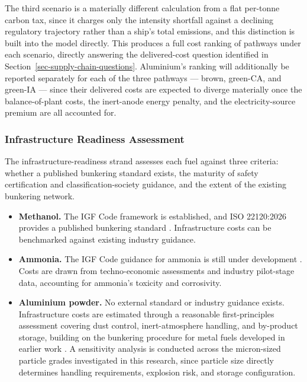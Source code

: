 \documentclass[12pt]{article}
\begin{document}
The third scenario is a materially different calculation from a flat per-tonne 
carbon tax, since it charges only the intensity shortfall against a declining 
regulatory trajectory rather than a ship's total emissions, and this distinction 
is built into the model directly. This produces a full cost ranking of pathways 
under each scenario, directly answering the delivered-cost question identified 
in Section~\ref{sec-supply-chain-questions}. Aluminium's ranking will 
additionally be reported separately for each of the three pathways --- brown, 
green-CA, and green-IA --- since their delivered costs are expected to diverge 
materially once the balance-of-plant costs, the inert-anode energy penalty, and 
the electricity-source premium are all accounted for.

\subsubsection*{Infrastructure Readiness Assessment}

The infrastructure-readiness strand assesses each fuel against three criteria: 
whether a published bunkering standard exists, the maturity of safety 
certification and classification-society guidance, and the extent of the existing 
bunkering network.

\begin{itemize}
    \item \textbf{Methanol.} The IGF Code framework is established, and ISO 
    22120:2026 provides a published bunkering standard \cite{iso-22120-2026}. 
    Infrastructure costs can be benchmarked against existing industry guidance.

    \item \textbf{Ammonia.} The IGF Code guidance for ammonia is still under 
    development \cite{imo-ammonia-guidelines}. Costs are drawn from 
    techno-economic assessments and industry pilot-stage data, accounting for 
    ammonia's toxicity and corrosivity.

    \item \textbf{Aluminium powder.} No external standard or industry guidance 
    exists. Infrastructure costs are estimated through a reasonable 
    first-principles assessment covering dust control, inert-atmosphere handling, 
    and by-product storage, building on the bunkering procedure for metal fuels 
    developed in earlier work \cite{iron-powder-container-ships}. A sensitivity 
    analysis is conducted across the micron-sized particle grades investigated in 
    this research, since particle size directly determines handling requirements, 
    explosion risk, and storage configuration.
\end{itemize}
\end{document}
